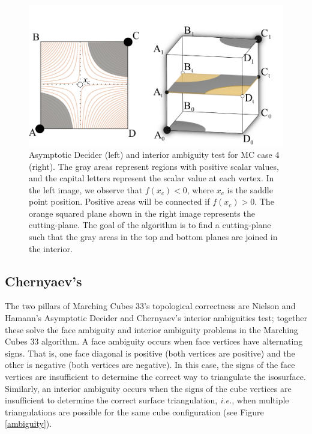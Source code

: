 \begin{figure}[t]
     \centering
     \includegraphics[width=0.65\linewidth]{chapter4/figures/cut-plane-fig.png}
     \caption{Asymptotic Decider (left) and \mc{} interior ambiguity test for MC case 4 (right). The gray areas represent regions with positive scalar values, and the capital letters represent the scalar value at each vertex. In the left image, we observe that $f(x_c) < 0$, where $x_c$ is the saddle point position. Positive areas will be connected if $f(x_c) > 0$. The orange squared plane shown in the right image represents the cutting-plane. The goal of the \mc{} algorithm is to find a cutting-plane such that the gray areas in the top and bottom planes are joined in the interior.}
     \label{interior_ambiguity}
\end{figure}


\subsection{Chernyaev's \mc{}}

The two pillars of Marching Cubes 33's topological correctness are Nielson and Hamann's Asymptotic Decider and Chernyaev's interior ambiguities test; together these solve the face ambiguity and interior ambiguity problems in the Marching Cubes 33 algorithm.
%
A face ambiguity occurs when face vertices have alternating signs. That is, one face diagonal is positive (both vertices are positive) and the other is negative (both vertices are negative). In this case, the signs of the face vertices are insufficient to determine the correct way to triangulate the isosurface. Similarly, an interior ambiguity occurs when the signs of the cube vertices are insufficient to determine the correct surface triangulation, \emph{i.e.}, when multiple triangulations are possible for the same cube configuration (see Figure \ref{ambiguity}).

